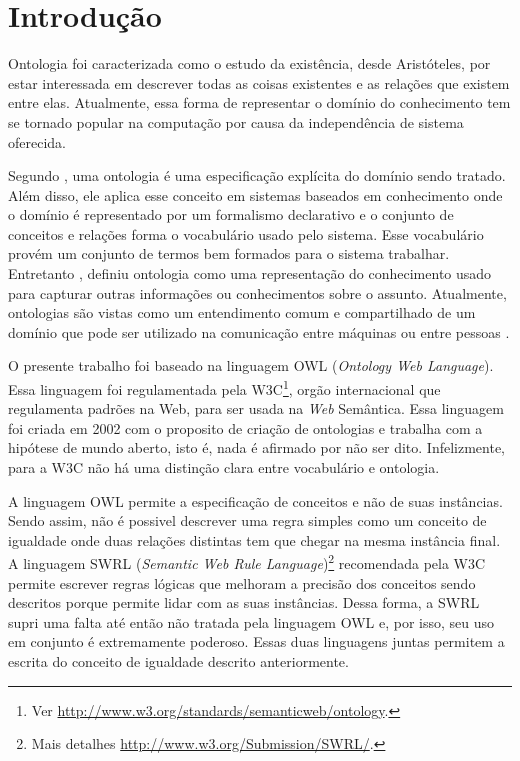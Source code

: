 \chapter{Introdução}

Ontologia foi caracterizada como o estudo da existência, desde Aristóteles,
por estar interessada em descrever todas as coisas existentes e as relações
que existem entre elas. Atualmente, essa forma de representar o domínio do
conhecimento tem se tornado popular na computação por causa da independência
de sistema oferecida.

Segundo \citet{gruber1993translation}, uma ontologia é uma especificação explícita do
domínio sendo tratado. Além disso, ele aplica esse conceito em sistemas
baseados em conhecimento onde o domínio é representado por um formalismo
declarativo e o conjunto de conceitos e relações forma o vocabulário usado
pelo sistema. Esse vocabulário provém um conjunto de termos bem formados para
o sistema trabalhar.
%
Entretanto \citet{ontoly2004Approach}, definiu ontologia como uma representação
do conhecimento usado para capturar outras informações ou conhecimentos sobre
o assunto. Atualmente, ontologias são vistas como um entendimento comum e
compartilhado de um domínio que pode ser utilizado na comunicação entre
máquinas ou entre pessoas \cite{wks2008towards}.

O presente trabalho foi baseado na linguagem OWL (\emph{Ontology Web
Language}). Essa linguagem foi regulamentada pela W3C\footnote{Ver
\url{http://www.w3.org/standards/semanticweb/ontology}.}, orgão internacional
que regulamenta padrões na Web, para ser usada na \emph{Web} Semântica.
Essa linguagem foi criada em 2002 com o proposito de criação de ontologias e
trabalha com a hipótese de mundo aberto, isto é, nada é afirmado por não ser
dito. Infelizmente, para a W3C não há uma distinção clara entre vocabulário e
ontologia.

A linguagem OWL permite a especificação de conceitos e não de suas instâncias.
Sendo assim, não é possivel descrever uma regra simples como um conceito de
igualdade onde duas relações distintas tem que chegar na mesma instância
final. %
%
A linguagem SWRL (\emph{Semantic Web Rule
Language})\footnote{Mais detalhes \url{http://www.w3.org/Submission/SWRL/}.}
recomendada pela W3C permite escrever regras lógicas que melhoram a
precisão dos conceitos sendo descritos porque permite lidar com as suas
instâncias. Dessa forma, a SWRL supri uma falta até então não tratada pela
linguagem OWL e, por isso, seu uso em conjunto é extremamente poderoso. Essas
duas linguagens juntas permitem a escrita do conceito de igualdade descrito
anteriormente.

